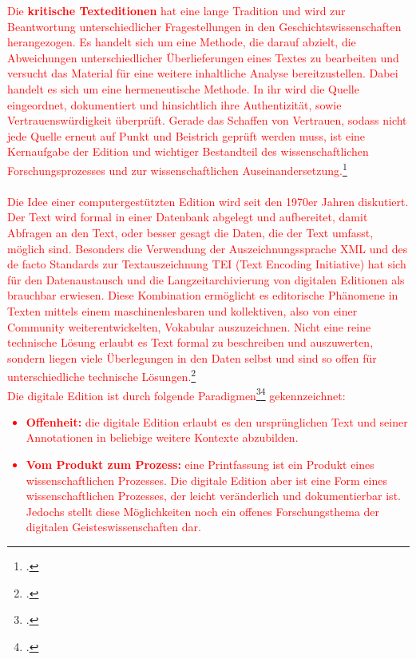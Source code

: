\documentclass[12pt,a4paper]{article}
\begin{document}
\textcolor{red}{
Die \textbf{kritische Texteditionen} hat eine lange Tradition und wird zur Beantwortung unterschiedlicher Fragestellungen in den Geschichtswissenschaften herangezogen. Es handelt sich um eine Methode, die darauf abzielt, die Abweichungen unterschiedlicher Überlieferungen eines Textes zu bearbeiten und versucht das Material für eine weitere inhaltliche Analyse bereitzustellen. Dabei handelt es sich um eine hermeneutische Methode. In ihr wird die Quelle eingeordnet, dokumentiert und hinsichtlich ihre Authentizität, sowie Vertrauenswürdigkeit überprüft. Gerade das Schaffen von Vertrauen, sodass nicht jede Quelle erneut auf Punkt und Beistrich geprüft werden muss, ist eine Kernaufgabe der Edition und wichtiger Bestandteil des wissenschaftlichen Forschungsprozesses und zur wissenschaftlichen Auseinandersetzung.\footcite[][S.101-144]{aumann1999digital}
\\
\\
Die Idee einer computergestützten Edition wird seit den 1970er Jahren diskutiert. Der Text wird formal in einer Datenbank abgelegt und aufbereitet, damit Abfragen an den Text, oder besser gesagt die Daten, die der Text umfasst, möglich sind. Besonders die Verwendung der Auszeichnungssprache XML und des de facto Standards zur Textauszeichnung TEI (Text Encoding Initiative) hat sich für den Datenaustausch und die Langzeitarchivierung von digitalen Editionen als brauchbar erwiesen. Diese Kombination ermöglicht es editorische Phänomene in Texten mittels einem maschinenlesbaren und kollektiven, also von einer Community weiterentwickelten, Vokabular auszuzeichnen. Nicht eine reine technische Lösung erlaubt es Text formal zu beschreiben und auszuwerten, sondern liegen viele Überlegungen in den Daten selbst und sind so offen für unterschiedliche technische Lösungen.\footcite[][S.180-181]{vogeler2018religion}
\\
Die digitale Edition ist durch folgende Paradigmen\footcite[][S.240-241]{sahle2017dhedition}\footcite[][S.102-108]{ScholgerMartina2018AadS} gekennzeichnet:
\begin{itemize}
\item \textbf{Offenheit:} die digitale Edition erlaubt es den ursprünglichen Text und seiner Annotationen in beliebige weitere Kontexte abzubilden. 
\item \textbf{Vom Produkt zum Prozess:} eine Printfassung ist ein Produkt eines wissenschaftlichen Prozesses. Die digitale Edition aber ist eine Form eines wissenschaftlichen Prozesses, der leicht veränderlich und dokumentierbar ist. Jedochs stellt diese Möglichkeiten noch ein offenes Forschungsthema der digitalen Geisteswissenschaften dar.

\end{itemize}}
\end{document}

